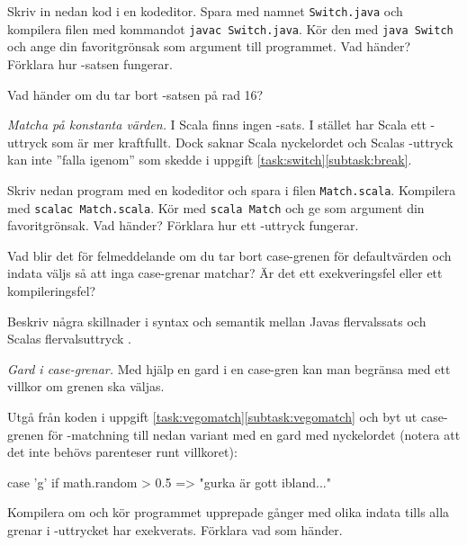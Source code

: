 \Subtask Skriv in nedan kod i en kodeditor. Spara med namnet \texttt{Switch.java} och kompilera filen med kommandot \texttt{javac Switch.java}. Kör den med \texttt{java Switch} och ange din favoritgrönsak som argument till programmet. Vad händer? Förklara hur -satsen fungerar.


\Subtask \label{subtask:break} Vad händer om du tar bort -satsen på rad 16?




\Task \label{task:vegomatch} \emph{Matcha på konstanta värden.} I Scala finns ingen -sats. I stället har Scala ett -uttryck som är mer kraftfullt. Dock saknar Scala nyckelordet  och Scalas -uttryck kan inte ''falla igenom'' som skedde i uppgift \ref{task:switch}\ref{subtask:break}.

\Subtask \label{subtask:vegomatch} Skriv nedan program med en kodeditor och spara i filen \texttt{Match.scala}. Kompilera med \texttt{scalac Match.scala}. Kör med \texttt{scala Match} och ge som argument din favoritgrönsak. Vad händer? Förklara hur ett -uttryck fungerar.


\Subtask Vad blir det för felmeddelande om du tar bort case-grenen för defaultvärden och indata väljs så att inga case-grenar matchar? Är det ett exekveringsfel eller ett kompileringsfel?


\Subtask\Pen Beskriv några skillnader i syntax och semantik mellan Javas flervalssats  och Scalas flervalsuttryck .




\Task \emph{Gard i case-grenar.} Med hjälp en gard  i en case-gren kan man begränsa med ett villkor om grenen ska väljas. 

Utgå från koden i uppgift \ref{task:vegomatch}\ref{subtask:vegomatch} och byt ut case-grenen för -matchning till nedan variant med en gard med nyckelordet  (notera att det inte behövs parenteser runt villkoret):
\begin{Code}
    case 'g' if math.random > 0.5 => "gurka är gott ibland..."
\end{Code}
Kompilera om och kör programmet upprepade gånger med olika indata tills alla grenar i -uttrycket har exekverats. Förklara vad som händer.

